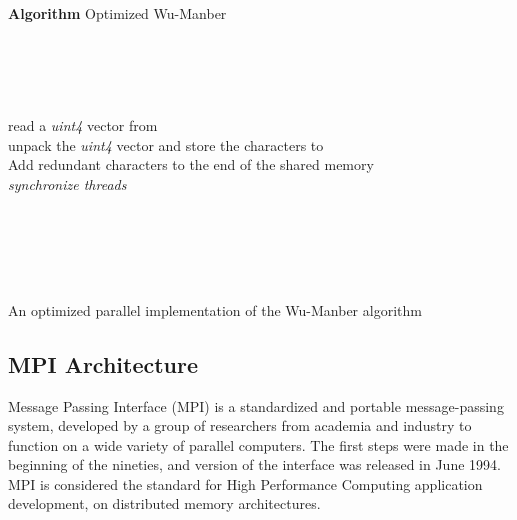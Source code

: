 \documentclass{ws-ijait}
\begin{document}
\begin{algorithm}[h]

\textbf{Algorithm} Optimized Wu-Manber\\

\\
\\
\\
\\


\For {  } {

	\For {  } {
		\If {  } {
			read a \textit{uint4} vector from \\
			unpack the \textit{uint4} vector and store the  characters to \\
		}
	}
	Add  redundant characters to the end of the shared memory\\
	\textit{synchronize threads}\\

	\\

	\While{ } {

		\\
	
		\uIf {  } {
			\\
		}
		
	}
}

\\

\caption{An optimized parallel implementation of the Wu-Manber algorithm}
\label{compl:cuda_WM_optimized_implementation}
\end{algorithm}

\clearpage

\subsection{MPI Architecture}
Message Passing Interface (MPI) is a standardized and portable message-passing system, developed by a group of researchers from academia and industry to function on a wide variety of parallel computers. The first steps were made in the beginning of the nineties, and version  of the interface was released in June 1994. MPI is considered the standard for High Performance Computing application development, on distributed memory architectures.\cite{Yang2011266}
\end{document}
